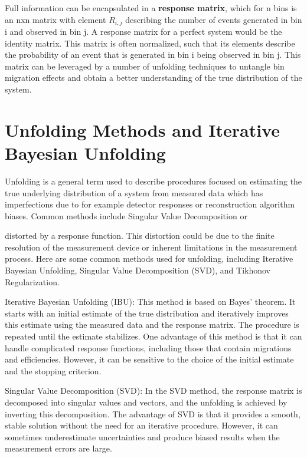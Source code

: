     

    Full information can be encapsulated in a \textbf{response matrix}, which for n bins is an nxn matrix with element $R_{i,j}$ describing the number of events generated in bin i and observed in bin j. A response matrix for a perfect system would be the identity matrix. This matrix is often normalized, such that its elements describe the probability of an event that is generated in bin i being observed in bin j. This matrix can be leveraged by a number of unfolding techniques to untangle bin migration effects and obtain a better understanding of the true distribution of the system. 


 \clearpage

\section{Unfolding Methods and Iterative Bayesian Unfolding}

    Unfolding is a general term used to describe procedures focused on estimating the true underlying distribution of a system from measured data which has imperfections due to for example detector responses or reconstruction algorithm biases. Common methods include Singular Value Decomposition \parencite{Klema1980TheApplications} or 

    
    
    
    distorted by a response function. This distortion could be due to the finite resolution of the measurement device or inherent limitations in the measurement process. Here are some common methods used for unfolding, including Iterative Bayesian Unfolding, Singular Value Decomposition (SVD), and Tikhonov Regularization.
    
    Iterative Bayesian Unfolding (IBU): This method is based on Bayes' theorem. It starts with an initial estimate of the true distribution and iteratively improves this estimate using the measured data and the response matrix. The procedure is repeated until the estimate stabilizes. One advantage of this method is that it can handle complicated response functions, including those that contain migrations and efficiencies. However, it can be sensitive to the choice of the initial estimate and the stopping criterion.
    
    Singular Value Decomposition (SVD): In the SVD method, the response matrix is decomposed into singular values and vectors, and the unfolding is achieved by inverting this decomposition. The advantage of SVD is that it provides a smooth, stable solution without the need for an iterative procedure. However, it can sometimes underestimate uncertainties and produce biased results when the measurement errors are large.
    
